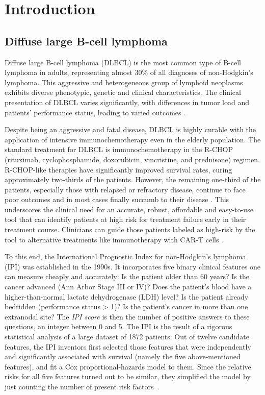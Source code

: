 \chapter{Introduction} \label{chap:intro}

\section{Diffuse large B-cell lymphoma}

Diffuse large B-cell lymphoma (DLBCL) is the most common type of B-cell lymphoma in adults, 
representing almost 30\% of all diagnoses of non-Hodgkin's lymphoma. 
This aggressive and heterogeneous group of 
lymphoid neoplasms exhibits
diverse phenotypic, genetic and clinical characteristics. The clinical presentation of 
DLBCL varies significantly, with differences in tumor load and patients' performance status, leading 
to varied outcomes \cite{dlbcl-review21}.

Despite being an aggressive and fatal disease, DLBCL is highly curable with the 
application of intensive immunochemotherapy even in the elderly population. The standard treatment 
for DLBCL is immunochemotherapy in the R-CHOP (rituximab, cyclophosphamide, doxorubicin, 
vincristine, and prednisone) regimen. R-CHOP-like therapies
have significantly improved survival rates, curing approximately two-thirds of the patients. 
However, the remaining one-third of the patients, especially 
those with relapsed or refractory disease, continue to face poor outcomes and in most cases finally 
succumb to their disease \citep{glass17}. This underscores the clinical 
need for an accurate, robust, affordable and easy-to-use tool that can identify patients at high risk 
for treatment failure early in their treatment course. Clinicians can guide those patients labeled 
as high-risk by the tool to alternative treatments like immunotherapy with CAR-T cells 
\cite{wang20}.

To this end, the International Prognostic Index for non-Hodgkin's lymphoma (IPI) was established in 
the 1990s. It incorporates five binary clinical features one can measure cheaply and 
accurately: Is the patient older than \num{60} years? Is the cancer advanced 
(Ann Arbor Stage III or IV)? Does the patient's blood have a higher-than-normal lactate dehydrogenase (LDH) 
level? Is the patient already 
bedridden (performance status > 1)? Is the patient's cancer in more than one extranodal site? The 
\textit{IPI score} is then the number of positive answers to these questions, an integer between 0 
and 5. The IPI is the result of a rigorous statistical analysis 
of a large dataset of \num{1872} patients: Out of twelve candidate features, the IPI inventors
first selected those features that were independently and significantly associated with survival 
(namely the five above-mentioned features), and fit a Cox proportional-hazards model to them.
Since the relative risks for all five features turned out to be similar, they simplified the model 
by just counting the number of present risk factors~\cite{ipi93}. 

